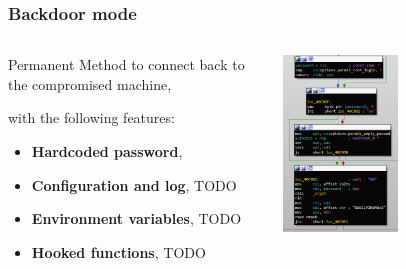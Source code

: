 \begin{frame}
	\frametitle{Backdoor mode}
	
  \begin{columns}
  \begin{column}{0.5\textwidth}
	Permanent Method to connect back to the compromised machine, 
	
	\medskip

	with the following features:
	
	\begin{itemize}
	  \item \textbf{Hardcoded password}, 
	  \item \textbf{Configuration and log}, TODO
	  \item \textbf{Environment variables}, TODO
	  \item \textbf{Hooked functions}, TODO
	\end{itemize}
  \end{column}
  \begin{column}{0.5\textwidth}  %
      \begin{center}
      
       \includegraphics[width=0.5\textwidth]{images/hardcoded_password}
       \end{center}
  \end{column}
  \end{columns}

\end{frame}
